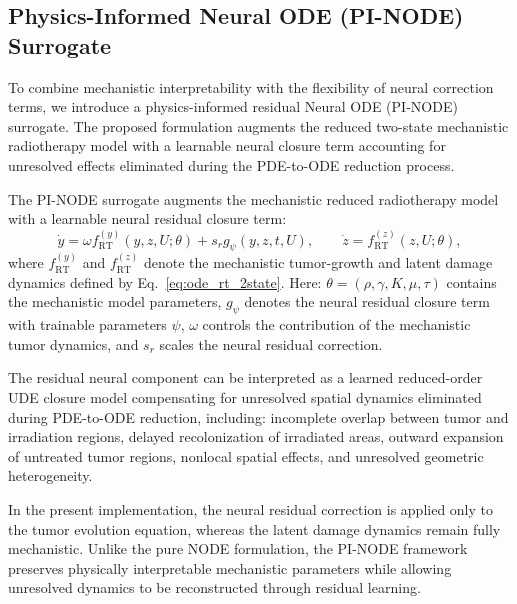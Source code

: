 \subsection{Physics-Informed Neural ODE (PI-NODE) Surrogate}

To combine mechanistic interpretability with the flexibility of neural
correction terms, we introduce a physics-informed residual Neural ODE
(PI-NODE) surrogate. The proposed formulation augments the reduced
two-state mechanistic radiotherapy model with a learnable neural
closure term accounting for unresolved effects eliminated during the
PDE-to-ODE reduction process.

The PI-NODE surrogate augments the mechanistic reduced radiotherapy
model with a learnable neural residual closure term:
\begin{equation}
\label{eq:pinode_weighted}
\dot y
=
\omega f^{(y)}_{\mathrm{RT}}(y,z,U;\theta)
+
s_r g_{\psi}(y,z,t,U),
\qquad
\dot z
=
f^{(z)}_{\mathrm{RT}}(z,U;\theta),
\end{equation}
where
\(f^{(y)}_{\mathrm{RT}}\)
and
\(f^{(z)}_{\mathrm{RT}}\)
denote the mechanistic tumor-growth and latent damage dynamics defined
by Eq.~\eqref{eq:ode_rt_2state}.
Here:
\(\theta=(\rho,\gamma,K,\mu,\tau)\)
contains the mechanistic model parameters,
\(g_{\psi}\) denotes the neural residual closure term with trainable
parameters \(\psi\),
\(\omega\) controls the contribution of the mechanistic tumor dynamics,
and \(s_r\) scales the neural residual correction.

The residual neural component can be interpreted as a learned
reduced-order UDE closure model compensating for unresolved spatial
dynamics eliminated during PDE-to-ODE reduction, including:
incomplete overlap between tumor and irradiation regions,
delayed recolonization of irradiated areas,
outward expansion of untreated tumor regions,
nonlocal spatial effects,
and unresolved geometric heterogeneity.

In the present implementation, the neural residual correction is applied
only to the tumor evolution equation, whereas the latent damage
dynamics remain fully mechanistic.
Unlike the pure NODE formulation, the PI-NODE framework preserves
physically interpretable mechanistic parameters while allowing
unresolved dynamics to be reconstructed through residual learning.


